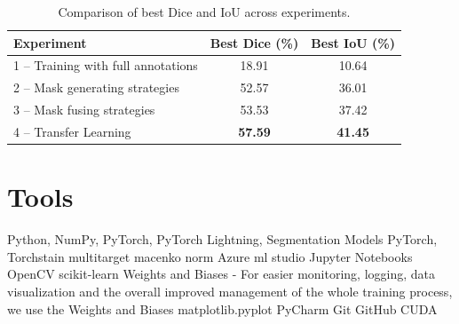 \begin{table}[H]
  \centering
  \begin{tabular}{ l | c | c } 
    \hline
    \textbf{Experiment}                                  & \textbf{Best Dice (\%)} & \textbf{Best IoU (\%)} \\
    \hline
    1 – Training with full annotations                   & 18.91                   & 10.64                  \\
    2 – Mask generating strategies                       & 52.57                   & 36.01                  \\
    3 – Mask fusing strategies                           & 53.53                   & 37.42                  \\
    4 – Transfer Learning                                & \textbf{57.59}          & \textbf{41.45}          \\
    \hline
  \end{tabular}
  \caption{Comparison of best Dice and IoU across experiments.}
  \label{tab:summary-experiments}
\end{table}


\section{Tools}
Python, 
NumPy, 
PyTorch, 
PyTorch Lightning,
Segmentation Models PyTorch, 
Torchstain multitarget macenko norm
Azure ml studio
Jupyter Notebooks
OpenCV
scikit-learn
Weights and Biases - For easier monitoring, logging, data visualization and the overall improved management of the whole training process, we use the Weights and Biases 
matplotlib.pyplot
PyCharm
Git
GitHub
CUDA